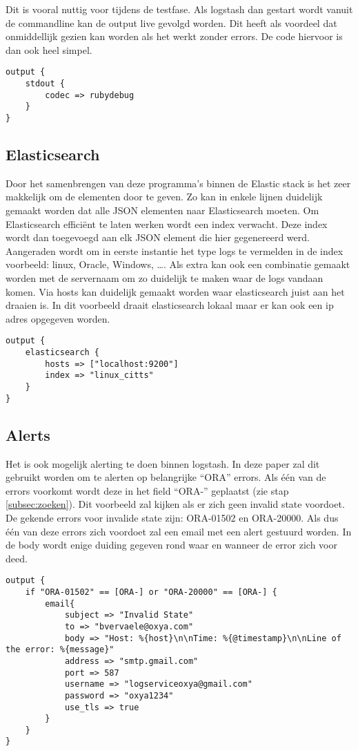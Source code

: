 Dit is vooral nuttig voor tijdens  de testfase. Als logstash dan gestart wordt vanuit de commandline kan de output live gevolgd worden. Dit heeft als voordeel dat onmiddellijk gezien kan worden als het werkt zonder errors. De code hiervoor is dan ook heel simpel.

\lstset{escapechar=@,style=customc}  
\begin{lstlisting}[frame=single]  
output {
	stdout {
		codec => rubydebug 
	}
}
\end{lstlisting}

\subsection{Elasticsearch}
\label{subsec:elasticsearch}

Door het samenbrengen van deze programma’s binnen de Elastic stack is het zeer makkelijk om de elementen door te geven. Zo kan in enkele lijnen duidelijk gemaakt worden dat alle JSON elementen naar Elasticsearch moeten. Om Elasticsearch efficiënt te laten werken wordt een index verwacht. Deze index wordt dan toegevoegd aan elk JSON element die hier gegenereerd werd. Aangeraden wordt om in eerste instantie het type logs te vermelden in de index voorbeeld: linux, Oracle, Windows, \dots. Als extra kan ook een combinatie gemaakt worden met de servernaam om zo duidelijk te maken waar de logs vandaan komen. 
Via hosts kan duidelijk  gemaakt worden waar elasticsearch juist aan het draaien is. In dit voorbeeld draait elasticsearch lokaal maar er kan ook een ip adres opgegeven worden.

\lstset{escapechar=@,style=customc}  
\begin{lstlisting}[frame=single]  
output {
	elasticsearch {
		hosts => ["localhost:9200"]
		index => "linux_citts"
	}
}
\end{lstlisting}

\subsection{Alerts}
\label{subsec:alerts}

Het is ook mogelijk alerting te doen binnen logstash. In deze paper zal dit gebruikt worden om te alerten op belangrijke  “ORA” errors. Als één van de errors voorkomt wordt deze in het field “ORA-” geplaatst (zie stap \ref{subsec:zoeken}). Dit voorbeeld zal kijken als er zich geen invalid state voordoet. De gekende errors voor invalide state zijn: ORA-01502 en ORA-20000. Als dus één van deze errors zich voordoet zal een email met een alert gestuurd worden. In de body wordt enige duiding gegeven rond waar en wanneer de error zich voor deed.

\lstset{escapechar=@,style=customc}  
\begin{lstlisting}[frame=single]
output {
	if "ORA-01502" == [ORA-] or "ORA-20000" == [ORA-] {
		email{
			subject => "Invalid State"
			to => "bvervaele@oxya.com"
			body => "Host: %{host}\n\nTime: %{@timestamp}\n\nLine of the error: %{message}"
			address => "smtp.gmail.com"
			port => 587
			username => "logserviceoxya@gmail.com"
			password => "oxya1234"
			use_tls => true
		}
	}	 
}

\end{lstlisting}